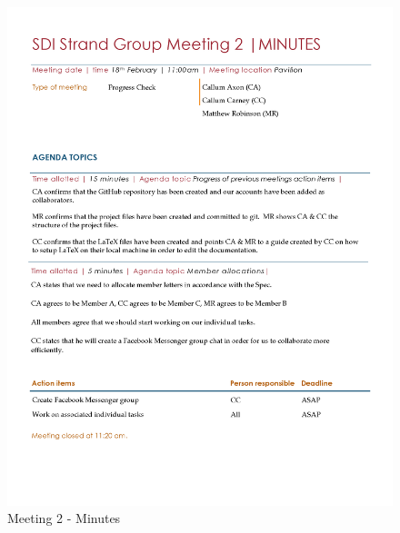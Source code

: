 \documentclass[
  english,
  a4paper,
,tablecaptionabove
]{scrartcl}
\begin{document}
\begin{figure}
\centering
\includegraphics{images/meeting-minutes/meeting-2.png}
\caption{Meeting 2 - Minutes}
\end{figure}
\end{document}
